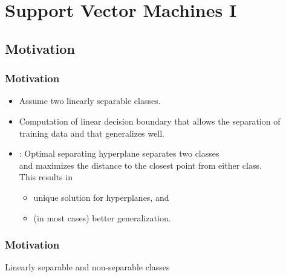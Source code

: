 \section{Support Vector Machines I}

\subsection{Motivation}

\begin{frame}
  \frametitle{Motivation}

  \begin{itemize}
  \item Assume two linearly separable classes. \\[.5cm]
  \item Computation of linear decision boundary that allows the separation of \\
    training data and that generalizes well.\\[.5cm]
  \item {}: Optimal separating hyperplane separates two classes \\
    and maximizes the distance to the closest point from either class. \\
    This results in
    \begin{itemize}
      \item unique solution for hyperplanes, and
      \item (in most cases) better generalization.
    \end{itemize}
  \end{itemize}
\end{frame}
 
 
\begin{frame}
  \frametitle{Motivation \cont}

  Linearly separable and non-separable classes
  
  \begin{columns}
      \begin{center}
        \resizebox{.9\linewidth}{!}{
          
        }
      \end{center}

      \begin{center}
        \resizebox{.9\linewidth}{!}{
          
        }
      \end{center}
  \end{columns}
\end{frame}


